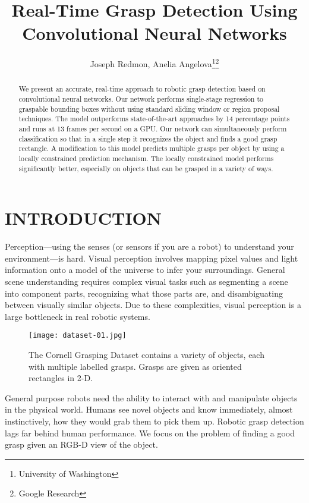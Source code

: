 \documentclass[letterpaper, 10 pt, conference]{ieeeconf}
\title{\LARGE \bf
Real-Time Grasp Detection Using Convolutional Neural Networks
}
\author{Joseph Redmon, Anelia Angelova\thanks{University of Washington}\thanks{Google Research}}
\begin{document}
\maketitle
\thispagestyle{empty}
\pagestyle{empty}


\begin{abstract}

We present an accurate, real-time approach to robotic grasp detection based on convolutional neural networks. Our network performs single-stage regression to graspable bounding boxes without using standard sliding window or region proposal techniques. The model outperforms state-of-the-art approaches by 14 percentage points and runs at 13 frames per second on a GPU. Our network can simultaneously perform classification so that in a single step it recognizes the object and finds a good grasp rectangle. A modification to this model predicts multiple grasps per object by using a locally constrained prediction mechanism. The locally constrained model performs significantly better, especially on objects that can be grasped in a variety of ways.
\end{abstract}


\section{INTRODUCTION}

Perception---using the senses (or sensors if you are a robot) to understand your environment---is hard. Visual perception involves mapping pixel values and light information onto a model of the universe to infer your surroundings. General scene understanding requires complex visual tasks such as segmenting a scene into component parts, recognizing what those parts are, and disambiguating between visually similar objects. Due to these complexities, visual perception is a large bottleneck in real robotic systems.
   \begin{figure}[hbtp]
      \centering
        \texttt{[image: dataset-01.jpg]}
      \caption{The Cornell Grasping Dataset contains a variety of objects, each with multiple labelled grasps. Grasps are given as oriented rectangles in 2-D.}
      \label{dataset}
   \end{figure}


General purpose robots need the ability to interact with and manipulate objects in the physical world. Humans see novel objects and know immediately, almost instinctively, how they would grab them to pick them up. Robotic grasp detection lags far behind human performance. We focus on the problem of finding a good grasp given an RGB-D view of the object.
\end{document}
